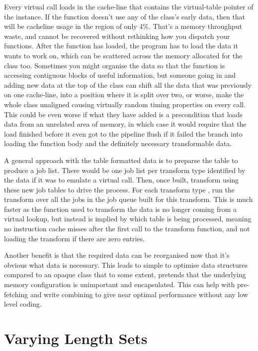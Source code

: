 Every virtual call loads in the cache-line that contains the virtual-table
pointer of the instance. If the function doesn't use any of the class's early
data, then that will be cache\-line usage in the region of only 4\%. That's a
memory throughput waste, and cannot be recovered without rethinking how you
dispatch your functions. After the function has loaded, the program has to load
the data it wants to work on, which can be scattered across the memory
allocated for the class too. Sometimes you might organise the data so that the
function is accessing contiguous blocks of useful information, but someone
going in and adding new data at the top of the class can shift all the data
that was previously on one cache-line, into a position where it is split over
two, or worse, make the whole class unaligned causing virtually random timing
properties on every call. This could be even worse if what they have added is a
precondition that loads data from an unrelated area of memory, in which case it
would require that the load finished before it even got to the pipeline flush
if it failed the branch into loading the function body and the definitely
	necessary transformable data.

A general approach with the table formatted data is to preparse the table to
produce a job list. There would be one job list per transform type identified
by the data if it was to emulate a virtual call. Then, once built, transform
using these new job tables to drive the process. For each transform type , run
the transform over all the jobs in the job queue built for this transform. This
is much faster as the function used to transform the data is no longer coming
from a virtual lookup, but instead is implied by which table is being
processed, meaning no instruction cache misses after the first call to the
transform function, and not loading the transform if there are zero entries.

Another benefit is that the required data can be reorganised now that it's
obvious what data is necessary. This leads to simple to optimise data
structures compared to an opaque class that to some extent, pretends that the
underlying memory configuration is unimportant and encapsulated. This can help
with pre-fetching and write combining to give near optimal performance without
any low level coding.

\section{Varying Length Sets}

